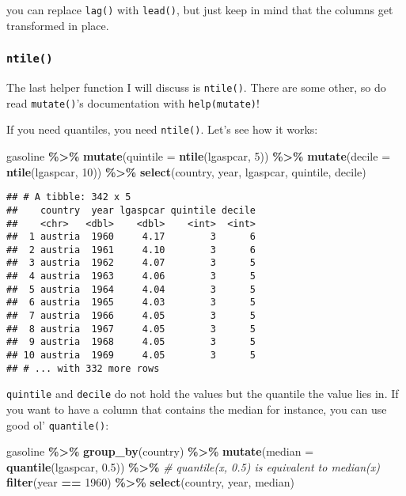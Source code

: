 \documentclass[
]{article}
\newenvironment{Shaded}{\begin{snugshade}}{\end{snugshade}}
\newcommand{\CommentTok}[1]{\textcolor[rgb]{0.56,0.35,0.01}{\textit{#1}}}
\newcommand{\DataTypeTok}[1]{\textcolor[rgb]{0.13,0.29,0.53}{#1}}
\newcommand{\DecValTok}[1]{\textcolor[rgb]{0.00,0.00,0.81}{#1}}
\newcommand{\FloatTok}[1]{\textcolor[rgb]{0.00,0.00,0.81}{#1}}
\newcommand{\KeywordTok}[1]{\textcolor[rgb]{0.13,0.29,0.53}{\textbf{#1}}}
\newcommand{\NormalTok}[1]{#1}
\newcommand{\OperatorTok}[1]{\textcolor[rgb]{0.81,0.36,0.00}{\textbf{#1}}}
\newcommand{\StringTok}[1]{\textcolor[rgb]{0.31,0.60,0.02}{#1}}
\begin{document}
you can replace \texttt{lag()} with \texttt{lead()}, but just keep in mind that the columns get transformed in
place.

\hypertarget{ntile}{%
\subsubsection{\texorpdfstring{\texttt{ntile()}}{ntile()}}\label{ntile}}

The last helper function I will discuss is \texttt{ntile()}. There are some other, so do read \texttt{mutate()}'s
documentation with \texttt{help(mutate)}!

If you need quantiles, you need \texttt{ntile()}. Let's see how it works:

\begin{Shaded}
\begin{Highlighting}[]
\NormalTok{gasoline }\OperatorTok{\%\textgreater{}\%}
\StringTok{  }\KeywordTok{mutate}\NormalTok{(}\DataTypeTok{quintile =} \KeywordTok{ntile}\NormalTok{(lgaspcar, }\DecValTok{5}\NormalTok{)) }\OperatorTok{\%\textgreater{}\%}
\StringTok{  }\KeywordTok{mutate}\NormalTok{(}\DataTypeTok{decile =} \KeywordTok{ntile}\NormalTok{(lgaspcar, }\DecValTok{10}\NormalTok{)) }\OperatorTok{\%\textgreater{}\%}
\StringTok{  }\KeywordTok{select}\NormalTok{(country, year, lgaspcar, quintile, decile)}
\end{Highlighting}
\end{Shaded}

\begin{verbatim}
## # A tibble: 342 x 5
##    country  year lgaspcar quintile decile
##    <chr>   <dbl>    <dbl>    <int>  <int>
##  1 austria  1960     4.17        3      6
##  2 austria  1961     4.10        3      6
##  3 austria  1962     4.07        3      5
##  4 austria  1963     4.06        3      5
##  5 austria  1964     4.04        3      5
##  6 austria  1965     4.03        3      5
##  7 austria  1966     4.05        3      5
##  8 austria  1967     4.05        3      5
##  9 austria  1968     4.05        3      5
## 10 austria  1969     4.05        3      5
## # ... with 332 more rows
\end{verbatim}

\texttt{quintile} and \texttt{decile} do not hold the values but the quantile the value lies in. If you want to
have a column that contains the median for instance, you can use good ol' \texttt{quantile()}:

\begin{Shaded}
\begin{Highlighting}[]
\NormalTok{gasoline }\OperatorTok{\%\textgreater{}\%}
\StringTok{  }\KeywordTok{group\_by}\NormalTok{(country) }\OperatorTok{\%\textgreater{}\%}
\StringTok{  }\KeywordTok{mutate}\NormalTok{(}\DataTypeTok{median =} \KeywordTok{quantile}\NormalTok{(lgaspcar, }\FloatTok{0.5}\NormalTok{)) }\OperatorTok{\%\textgreater{}\%}\StringTok{ }\CommentTok{\# quantile(x, 0.5) is equivalent to median(x)}
\StringTok{  }\KeywordTok{filter}\NormalTok{(year }\OperatorTok{==}\StringTok{ }\DecValTok{1960}\NormalTok{) }\OperatorTok{\%\textgreater{}\%}
\StringTok{  }\KeywordTok{select}\NormalTok{(country, year, median)}
\end{Highlighting}
\end{Shaded}
\end{document}
